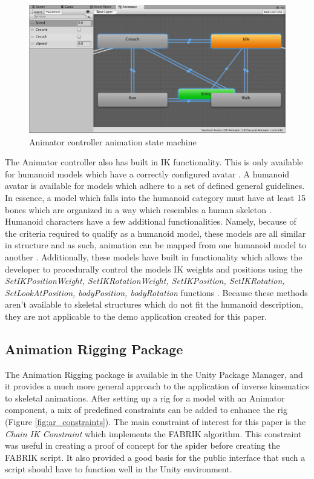 \begin{figure}
    \centering
    \includegraphics[width=\textwidth]{grafika/animator_controller.png}
    \caption{Animator controller animation state machine \cite{unity_animator}}
    \label{fig:anim_state}
\end{figure}

The Animator controller also has built in IK functionality. This is only
available for humanoid models which have a correctly configured avatar
\cite{unity_ik}. A humanoid avatar is available for models which adhere to a set
of defined general guidelines. In essence, a model which falls into the humanoid
category must have at least 15 bones which are organized in a way which
resembles a human skeleton \cite{unity_humanoid_import}. Humanoid characters
have a few additional functionalities. Namely, because of the criteria required
to qualify as a humanoid model, these models are all similar in structure and as
such, animation can be mapped from one humanoid model to another
\cite{unity_humanoid_avatars}. Additionally, these models have built in
functionality which allows the developer to procedurally control the models IK
weights and positions using the \textit{SetIKPositionWeight,
SetIKRotationWeight, SetIKPosition, SetIKRotation, SetLookAtPosition,
bodyPosition, bodyRotation} functions \cite{unity_ik, unity_humanoid_avatars}.
Because these methods aren't available to skeletal structures which do not fit
the humanoid description, they are not applicable to the demo application
created for this paper.

\subsection{Animation Rigging Package}

The Animation Rigging package is available in the Unity Package Manager, and it
provides a much more general approach to the application of inverse kinematics
to skeletal animations. After setting up a rig for a model with an Animator
component, a mix of predefined constraints can be added to enhance the rig
(Figure \ref{fig:ar_constraints}). The main constraint of interest for this
paper is the \textit{Chain IK Constraint} which implements the FABRIK algorithm.
This constraint was useful in creating a proof of concept for the spider before
creating the FABRIK script. It also provided a good basis for the public
interface that such a script should have to function well in the Unity
environment.

